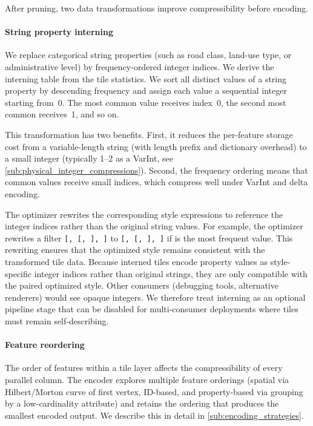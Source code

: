 \noindent After pruning, two data transformations improve compressibility before encoding.

\paragraph{String property interning}\label{sub:string_property_interning}
We replace categorical string properties (such as road class, land-use type, or administrative level) by frequency-ordered integer indices.
We derive the interning table from the tile statistics.
We sort all distinct values of a string property by descending frequency and assign each value a sequential integer starting from~0.
The most common value receives index~0, the second most common receives~1, and so on.

This transformation has two benefits.
First, it reduces the per-feature storage cost from a variable-length string (with length prefix and dictionary overhead) to a small integer (typically \qtyrange{1}{2}{\byte} as a \ac{VarInt}, see \cref{sub:physical_integer_compressions}).
Second, the frequency ordering means that common values receive small indices, which compress well under \ac{VarInt} and delta encoding.

The optimizer rewrites the corresponding style expressions to reference the integer indices rather than the original string values.
For example, the optimizer rewrites a filter \texttt{[, [, ], ]} to \texttt{[, [, ], ]} if  is the most frequent value.
This rewriting ensures that the optimized style remains consistent with the transformed tile data.
Because interned tiles encode property values as style-specific integer indices rather than original strings, they are only compatible with the paired optimized style.
Other consumers (debugging tools, alternative renderers) would see opaque integers.
We therefore treat interning as an optional pipeline stage that can be disabled for multi-consumer deployments where tiles must remain self-describing.

\paragraph{Feature reordering}\label{sub:feature_reordering}
The order of features within a tile layer affects the compressibility of every parallel column.
The encoder explores multiple feature orderings (spatial via Hilbert/Morton curve of first vertex, ID-based, and property-based via grouping by a low-cardinality attribute) and retains the ordering that produces the smallest encoded output.
We describe this in detail in \cref{sub:encoding_strategies}.

